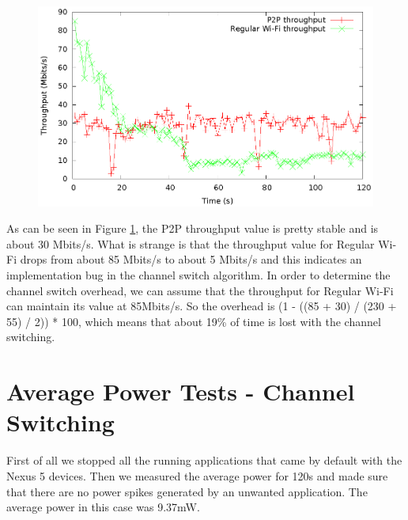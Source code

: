 \begin{figure}[h!]
\includegraphics{src/img/throughpout.eps}
\label{img-thr}
\end{figure}

As can be seen in Figure \ref{img-thr}, the P2P throughput value is pretty stable and is about 30 Mbits/s. What is strange is that the throughput value for Regular Wi-Fi drops from about 85 Mbits/s to about 5 Mbits/s and this indicates an implementation bug in the channel switch algorithm. In order to determine the channel switch overhead, we can assume that the throughput for Regular Wi-Fi can maintain its value at 85Mbits/s. So the overhead is (1 - ((85 + 30) / (230 + 55) / 2)) * 100, which means that about 19\% of time is lost with the channel switching.

\section{Average Power Tests - Channel Switching}
\label{sec:nexus5-consumption}

First of all we stopped all the running applications that came by default with the Nexus 5 devices. Then we measured the average power for 120s and made sure that there are no power spikes generated by an unwanted application. The average power in this case was 9.37mW.

